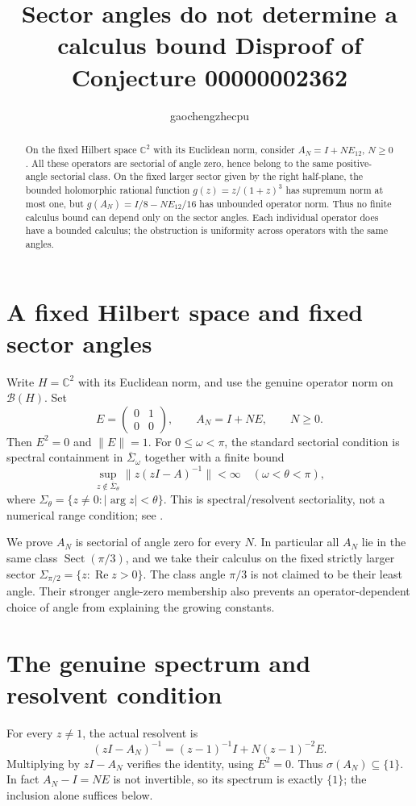 \documentclass[11pt]{article}
\title{Sector angles do not determine a calculus bound\newline
\large Disproof of Conjecture 00000002362}
\author{gaochengzhecpu}\date{}
\begin{document}
\maketitle
\begin{abstract}
On the fixed Hilbert space $\mathbb C^2$ with its Euclidean
norm, consider $A_N=I+NE_{12}$, $N\geq0$. All these
operators are sectorial of angle zero, hence belong to
the same positive-angle sectorial class. On the fixed
larger sector given by the right half-plane, the bounded
holomorphic rational function $g(z)=z/(1+z)^3$ has
supremum norm at most one, but
$g(A_N)=I/8-NE_{12}/16$ has unbounded operator norm.
Thus no finite calculus bound can depend only on the
sector angles. Each individual operator does have a
bounded calculus; the obstruction is uniformity across
operators with the same angles.
\end{abstract}

\section*{A fixed Hilbert space and fixed sector angles}
Write $H=\mathbb C^2$ with its Euclidean norm, and use
the genuine operator norm on $\mathcal B(H)$. Set
\[
 E=\begin{pmatrix}0&1\\0&0\end{pmatrix},\qquad
 A_N=I+NE,\qquad N\geq0.
\]
Then $E^2=0$ and $\|E\|=1$. For $0\leq\omega<\pi$,
the standard sectorial condition is spectral containment
in $\overline\Sigma_\omega$ together with a finite bound
\[
 \sup_{z\notin\overline\Sigma_\theta}
                \|z(zI-A)^{-1}\|<\infty
                 \quad(\omega<\theta<\pi),
\]
where $\Sigma_\theta=\{z\ne0:|\arg z|<\theta\}$.
This is spectral/resolvent sectoriality, not a numerical
range condition; see \cite[Section 2.1]{bhm}.

We prove $A_N$ is sectorial of angle zero for every $N$.
In particular all $A_N$ lie in the same class
$\operatorname{Sect}(\pi/3)$, and we take their calculus
on the fixed strictly larger sector
$\Sigma_{\pi/2}=\{z:\operatorname{Re}z>0\}$.
The class angle $\pi/3$ is not claimed to be their
least angle. Their stronger angle-zero membership
also prevents an operator-dependent choice of angle
from explaining the growing constants.

\newpage
\section*{The genuine spectrum and resolvent condition}
For every $z\ne1$, the actual resolvent is
\[
 (zI-A_N)^{-1}=(z-1)^{-1}I+N(z-1)^{-2}E.
\]
Multiplying by $zI-A_N$ verifies the identity, using
$E^2=0$. Thus $\sigma(A_N)\subseteq\{1\}$.
In fact $A_N-I=NE$ is not invertible, so its spectrum
is exactly $\{1\}$; the inclusion alone suffices below.
\end{document}
